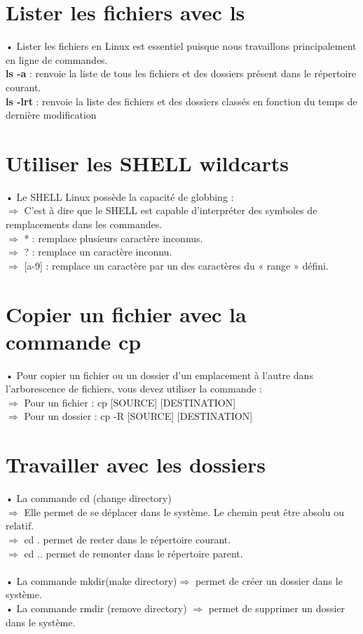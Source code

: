 \documentclass[a4paper, 11pt, french, oneside]{book}
\begin{document}
		\section{Lister les fichiers avec ls} 
		    • Lister les fichiers en Linux est essentiel puisque nous travaillons principalement en ligne de commandes.\\
			\textbf{ls -a} : renvoie la liste de tous les fichiers et des dossiers présent dans le répertoire courant.\\
			\textbf{ls -lrt} : renvoie la liste des fichiers et des dossiers classés en fonction du temps de dernière modification
		\section{Utiliser les SHELL wildcarts} 
		    • Le SHELL Linux possède la capacité de globbing :\\
			$\Rightarrow$ C’est à dire que le SHELL est capable d’interpréter des symboles de remplacements dans les commandes.\\
			$\Rightarrow$ * : remplace plusieurs caractère inconnus.\\
			$\Rightarrow$ ? : remplace un caractère inconnu.\\
			$\Rightarrow$ [a-9] : remplace un caractère par un des caractères du « range » défini.
		\section{Copier un fichier avec la commande cp}  
		    • Pour copier un fichier ou un dossier d’un emplacement à l’autre dans l’arborescence de fichiers, vous devez utiliser la commande :\\
			$\Rightarrow$ Pour un fichier : cp [SOURCE] [DESTINATION]\\
			$\Rightarrow$ Pour un dossier : cp -R [SOURCE] [DESTINATION]
		\section{Travailler avec les dossiers}
		    • La commande cd (change directory)\\
			$\Rightarrow$ Elle permet de se déplacer dans le système. Le chemin peut être absolu ou relatif.\\
			$\Rightarrow$ cd . permet de rester dans le répertoire courant.\\
		    $\Rightarrow$ cd .. permet de remonter dans le répertoire parent.\\\\
		    • La commande mkdir(make directory)$\Rightarrow$ permet de créer un dossier dans le système.\\
			• La commande rmdir (remove directory) $\Rightarrow$ permet de supprimer un dossier dans le système.
\end{document}
